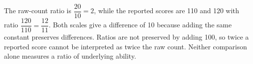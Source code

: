 The raw-count ratio is $\dfrac{20}{10}=2$, while the reported scores are 110 and 120 with ratio $\dfrac{120}{110}=\dfrac{12}{11}$. Both scales give a difference of 10 because adding the same constant preserves differences. Ratios are not preserved by adding 100, so twice a reported score cannot be interpreted as twice the raw count. Neither comparison alone measures a ratio of underlying ability.
